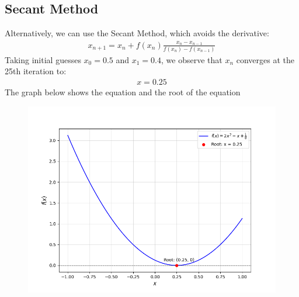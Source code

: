 \documentclass[journal]{IEEEtran}
\begin{document}
\begin{enumerate}
\section*{Secant Method}
Alternatively, we can use the Secant Method, which avoids the derivative:
\begin{align}
    x_{n+1} = x_n + f(x_n) \frac{x_n - x_{n-1}}{f(x_n) - f(x_{n-1})}
\end{align}
Taking initial guesses $x_0 = 0.5$ and $x_1 = 0.4$, we observe that $x_n$ converges at the 25th iteration to:
\begin{align}
    x = 0.25
\end{align}
The graph below shows the equation and the root of the equation
\begin{figure}
    \centering
    \includegraphics[width=\columnwidth]{figs/fig.png}
\end{figure}

\end{enumerate}
\end{document}
